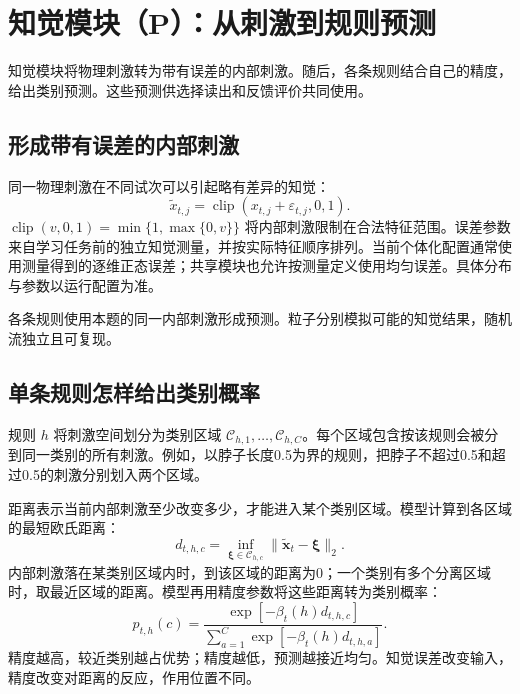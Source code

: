 \documentclass[12pt]{article}
\newcommand{\clip}{\operatorname{clip}}
\begin{document}
\section{知觉模块（P）：从刺激到规则预测}
\label{sec:perception}

知觉模块将物理刺激转为带有误差的内部刺激。随后，各条规则结合自己的精度，给出类别预测。这些预测供选择读出和反馈评价共同使用。

\subsection{形成带有误差的内部刺激}

同一物理刺激在不同试次可以引起略有差异的知觉：
\begin{equation}
\widetilde x_{t,j}=\clip(x_{t,j}+\varepsilon_{t,j},0,1).
\label{eq:perception}
\end{equation}
$\clip(v,0,1)=\min\{1,\max\{0,v\}\}$ 将内部刺激限制在合法特征范围。误差参数来自学习任务前的独立知觉测量，并按实际特征顺序排列。当前个体化配置通常使用测量得到的逐维正态误差；共享模块也允许按测量定义使用均匀误差。具体分布与参数以运行配置为准。

各条规则使用本题的同一内部刺激形成预测。粒子分别模拟可能的知觉结果，随机流独立且可复现。

\subsection{单条规则怎样给出类别概率}

规则 $h$ 将刺激空间划分为类别区域 $\mathcal C_{h,1},\ldots,\mathcal C_{h,C}$。每个区域包含按该规则会被分到同一类别的所有刺激。例如，以脖子长度0.5为界的规则，把脖子不超过0.5和超过0.5的刺激分别划入两个区域。

距离表示当前内部刺激至少改变多少，才能进入某个类别区域。模型计算到各区域的最短欧氏距离：
\begin{equation}
d_{t,h,c}=\inf_{\bm \xi\in\mathcal C_{h,c}}
\|\widetilde{\bm x}_t-\bm \xi\|_2.
\label{eq:distance}
\end{equation}
内部刺激落在某类别区域内时，到该区域的距离为0；一个类别有多个分离区域时，取最近区域的距离。模型再用精度参数将这些距离转为类别概率：
\begin{equation}
p_{t,h}(c)=
\frac{\exp[-\beta_t(h)d_{t,h,c}]}
{\sum_{a=1}^{C}\exp[-\beta_t(h)d_{t,h,a}]}.
\label{eq:emission}
\end{equation}
精度越高，较近类别越占优势；精度越低，预测越接近均匀。知觉误差改变输入，精度改变对距离的反应，作用位置不同。
\end{document}
